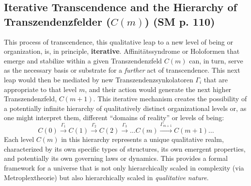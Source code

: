 \documentclass[
    12pt,              %
    a4paper,           %
    headings=normal,   %
    twoside=true,      %
    BCOR=8mm,          %
]{scrbook}
\newcommand{\q}[1]{\enquote{#1}}
\newcommand{\transzendenzstufe}[1]{C(#1)}
\newcommand{\transzendenzsynkolator}{\Gamma_i}
\begin{document}
\subsection{Iterative Transcendence and the Hierarchy of Transzendenzfelder (\(\transzendenzstufe{m}\)) (SM p. 110)}
\label{sec:ch6_iterative_transcendence}
This process of transcendence, this qualitative leap to a new level of being or organization, is, in principle, \textbf{iterative}. Affinitätssyndrome or Holoformen that emerge and stabilize within a given Transzendenzfeld \(\transzendenzstufe{m}\) can, in turn, serve as the necessary basis or substrate for a \textit{further} act of transcendence. This next leap would then be mediated by new Transzendenzsynkolatoren \(\transzendenzsynkolator\) that are appropriate to that level \(m\), and their action would generate the next higher Transzendenzfeld, \(\transzendenzstufe{m+1}\). This iterative mechanism creates the possibility of a potentially infinite hierarchy of qualitatively distinct organizational levels or, as one might interpret them, different \q{domains of reality} or levels of being:
\[ \transzendenzstufe{0} \xrightarrow{\Gamma_1} \transzendenzstufe{1} \xrightarrow{\Gamma_2} \transzendenzstufe{2} \xrightarrow{\Gamma_3} \ldots \transzendenzstufe{m} \xrightarrow{\Gamma_{m+1}} \transzendenzstufe{m+1} \ldots \]
Each level \(\transzendenzstufe{m}\) in this hierarchy represents a unique qualitative realm, characterized by its own specific types of structures, its own emergent properties, and potentially its own governing laws or dynamics. This provides a formal framework for a universe that is not only hierarchically scaled in complexity (via Metroplextheorie) but also hierarchically scaled in \textit{qualitative nature}.
\end{document}

